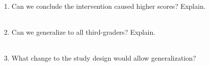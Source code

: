 \documentclass[10pt]{article}
\begin{document}
\begin{practicebox}
\vspace{6pt}
\begin{enumerate}[label=(\alph*), leftmargin=2em, itemsep=8pt]
  \item Can we conclude the intervention caused higher scores? Explain.\\
        \writeline\\[1pt]\writeline
  \item Can we generalize to all third-graders? Explain.\\
        \writeline\\[1pt]\writeline
  \item What change to the study design would allow generalization?\\
        \writeline\\[1pt]\writeline
\end{enumerate}
\end{practicebox}
\end{document}
